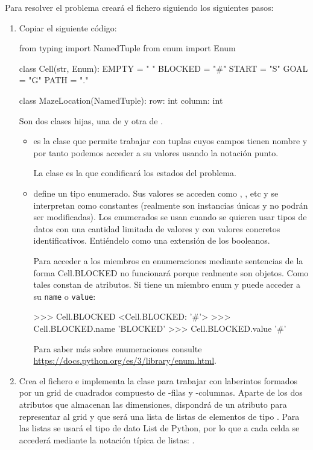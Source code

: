 Para resolver el problema creará el fichero  siguiendo los siguientes pasos:

\begin{enumerate}
\item Copiar el siguiente código:
\begin{pyverbatim}[][frame=single]
from typing import NamedTuple
from enum import Enum

class Cell(str, Enum):
    EMPTY = " "
    BLOCKED = "#"
    START = "S"
    GOAL = "G"
    PATH = "."

class MazeLocation(NamedTuple):
    row: int
    column: int
\end{pyverbatim}

Son dos clases hijas, una de  y otra de  .
\begin{itemize}
\item {} es la clase que permite trabajar con tuplas cuyos campos tienen nombre y por tanto podemos acceder a su valores usando la notación punto. 

La clase  es la que condificará los estados del problema.

\item {} define un tipo enumerado. Sus valores se acceden como , , etc y se interpretan como constantes (realmente son instancias únicas y no podrán ser modificadas). Los enumerados se usan cuando se quieren usar tipos de datos con una cantidad limitada de valores y con valores concretos identificativos. Entiéndelo como una extensión de los booleanos.


Para acceder a los miembros en enumeraciones mediante sentencias de la forma Cell.BLOCKED no funcionará porque realmente son objetos. Como tales constan de atributos. Si tiene un miembro enum y puede acceder a su {\tt name} o {\tt value}:

\begin{pyverbatim}[][frame=single]
>>> Cell.BLOCKED
<Cell.BLOCKED: '#'>
>>> Cell.BLOCKED.name
'BLOCKED'
>>> Cell.BLOCKED.value
'#'
\end{pyverbatim}

Para saber más sobre enumeraciones consulte \url{https://docs.python.org/es/3/library/enum.html}.
\end{itemize}

\item Crea el fichero  e implementa la clase  para trabajar con laberintos formados por un grid de cuadrados compuesto de -filas y -columnas. 
Aparte de los dos atributos que almacenan las dimensiones, dispondrá de un atributo para representar al grid y que será una lista de listas de elementos de tipo . 
Para las listas se usará el tipo de dato List de Python, por lo que a cada celda se accederá mediante la notación típica de listas:  .


\end{enumerate}
